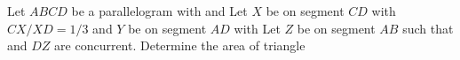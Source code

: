 Let $ABCD$ be a parallelogram with   and   Let $X$ be on segment $CD$ with $CX/XD=1/3$ and $Y$ be on segment $AD$ with   Let $Z$ be on segment $AB$ such that   and $DZ$ are concurrent.  Determine the area of triangle 